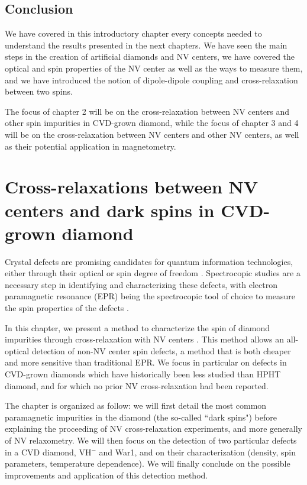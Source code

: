 \documentclass[a4paper, 11pt]{report}
\begin{document}
\section{Conclusion}

We have covered in this introductory chapter every concepts needed to understand the results presented in the next chapters. We have seen the main steps in the creation of artificial diamonds and NV centers, we have covered the optical and spin properties of the NV center as well as the ways to measure them, and we have introduced the notion of dipole-dipole coupling and cross-relaxation between two spins.

The focus of chapter 2 will be on the cross-relaxation between NV centers and other spin impurities in CVD-grown diamond, while the focus of chapter 3 and 4 will be on the cross-relaxation between NV centers and other NV centers, as well as their potential application in magnetometry.

\chapter{Cross-relaxations between NV centers and dark spins in CVD-grown diamond}
Crystal defects are promising candidates for quantum information technologies, either through their optical or spin degree of freedom \citep{aharonovich2016solid, atature2018material, bassett2019quantum}. Spectrocopic studies are a necessary step in identifying and characterizing these defects, with electron paramagnetic resonance (EPR) being the spectrocopic tool of choice to measure the spin properties of the defects \citep{newton2007epr}. 

In this chapter, we present a method to characterize the spin of diamond impurities through cross-relaxation with NV centers \citep{hall2016detection,pellet2021optical}. This method allows an all-optical detection of non-NV center spin defects, a method that is both cheaper and more sensitive than traditional EPR. We focus in particular on defects in CVD-grown diamonds which have historically been less studied than HPHT diamond, and for which no prior NV cross-relaxation had been reported. 

The chapter is organized as follow: we will first detail the most common paramagnetic impurities in the diamond (the so-called ``dark spins") before explaining the proceeding of NV cross-relaxation experiments, and more generally of NV relaxometry. We will then focus on the detection of two particular defects in a CVD diamond, VH$^-$ and War1, and on their characterization (density, spin parameters, temperature dependence). We will finally conclude on the possible improvements and application of this detection method.
\end{document}
